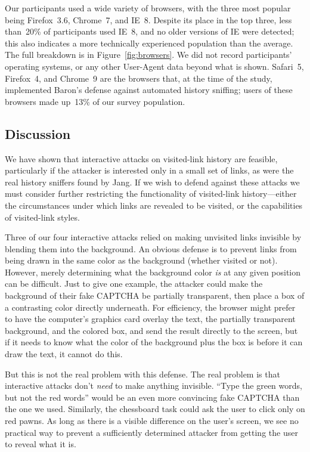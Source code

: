 \documentclass[conference]{IEEEtran}
\begin{document}
Our participants used a wide variety of browsers, with the three most
popular being Firefox~3.6, Chrome~7, and IE~8.  Despite its place in
the top three, less than~20\% of participants used IE~8, and no older
versions of IE were detected; this also indicates a more technically
experienced population than the average.  The full breakdown is in
Figure~\ref{fig:browsers}.  We did not record participants' operating
systems, or any other User-Agent data beyond what is shown.  Safari~5,
Firefox~4, and Chrome~9 are the browsers that, at the time of the
study, implemented Baron's defense against automated history sniffing;
users of these browsers made up~13\% of our survey population.

\subsection{Discussion}\label{sec:discussion1}

We have shown that interactive attacks on visited-link history are
feasible, particularly if the attacker is interested only in a small
set of links, as were the real history sniffers found by Jang.
If we wish to defend against these attacks we must consider further
restricting the functionality of visited-link history---either the
circumstances under which links are revealed to be visited, or the
capabilities of visited-link styles.

Three of our four interactive attacks relied on making unvisited links
invisible by blending them into the background.  An obvious defense is
to prevent links from being drawn in the same color as the background
(whether visited or not).  However, merely determining what the
background color \emph{is} at any given position can be difficult.
Just to give one example, the attacker could make the background of
their fake CAPTCHA be partially transparent, then place a box of a
contrasting color directly underneath.  For efficiency, the browser
might prefer to have the computer's graphics card overlay the text,
the partially transparent background, and the colored box, and send
the result directly to the screen, but if it needs to know what the
color of the background plus the box is before it can draw the text,
it cannot do this.

But this is not the real problem with this defense.  The real problem
is that interactive attacks don't \emph{need} to make anything
invisible.  “Type the green words, but not the red words” would be an
even more convincing fake CAPTCHA than the one we used.  Similarly,
the chessboard task could ask the user to click only on red pawns.  As
long as there is a visible difference on the user's screen, we see no
practical way to prevent a sufficiently determined attacker from
getting the user to reveal what it is.
\end{document}
